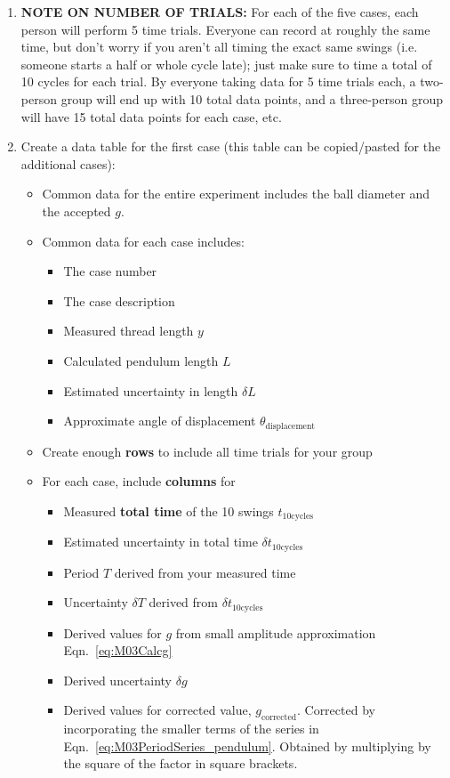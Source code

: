 \begin{enumerate}
\item \textbf{NOTE ON NUMBER OF TRIALS:} For each of the five cases, each person will perform 5 time trials. Everyone can record at roughly the same time, but don't worry if you aren't all timing the exact same swings (i.e. someone starts a half or whole cycle late); just make sure to time a total of 10 cycles for each trial. By everyone taking data for 5 time trials each, a two-person group will end up with 10 total data points, and a three-person group will have 15 total data points for each case, etc.

\item Create a data table for the first case (this table can be copied/pasted for the additional cases):
\begin{itemize}
\item Common data for the entire experiment includes the ball diameter and the accepted $g$.
\item Common data for each case includes:
\begin{itemize}
  \item The case number
  \item The case description
  \item Measured thread length $y$
  \item Calculated pendulum length $L$
  \item Estimated uncertainty in length $\delta L$
  \item Approximate angle of displacement $\theta_\text{displacement}$
\end{itemize}
\item Create enough \textbf{rows} to include all time trials for your group
\item For each case, include \textbf{columns} for
  \begin{itemize}
  \item Measured \textbf{total time} of the 10 swings $t_{10\text{cycles}}$
  \item Estimated uncertainty in total time $\delta t_{10\text{cycles}}$
  \item Period $T$ derived from your measured time
  \item Uncertainty $\delta T$ derived from $\delta t_{10\text{cycles}}$
  \item Derived values for $g$ from small amplitude approximation Eqn.~\ref{eq:M03Calcg}
  \item Derived uncertainty $\delta g$
  \item Derived values for corrected value, $g_\text{corrected}$. Corrected by incorporating the smaller terms of the series in Eqn.~\ref{eq:M03PeriodSeries_pendulum}. Obtained by multiplying by the square of the factor in square brackets.

\end{itemize}
\end{itemize}
\end{enumerate}
